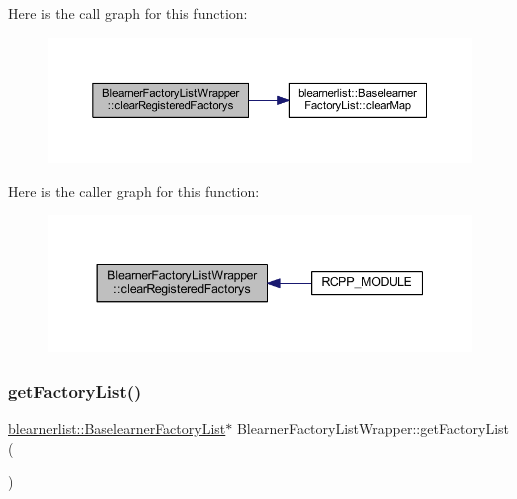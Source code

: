 Here is the call graph for this function\+:\nopagebreak
\begin{figure}[H]
\begin{center}
\leavevmode
\includegraphics[width=350pt]{class_blearner_factory_list_wrapper_a290316574cfb239214256f8f3610d475_cgraph}
\end{center}
\end{figure}
Here is the caller graph for this function\+:\nopagebreak
\begin{figure}[H]
\begin{center}
\leavevmode
\includegraphics[width=344pt]{class_blearner_factory_list_wrapper_a290316574cfb239214256f8f3610d475_icgraph}
\end{center}
\end{figure}
\mbox{\label{class_blearner_factory_list_wrapper_a985fa4f35e74e44cd91567fb14d575ab}} 
\subsubsection{\texorpdfstring{get\+Factory\+List()}{getFactoryList()}}
{\footnotesize\ttfamily \mbox{\hyperlink{classblearnerlist_1_1_baselearner_factory_list}{blearnerlist\+::\+Baselearner\+Factory\+List}}$\ast$ Blearner\+Factory\+List\+Wrapper\+::get\+Factory\+List (\begin{DoxyParamCaption}{ }\end{DoxyParamCaption})\hspace{0.3cm}{\ttfamily [inline]}}

